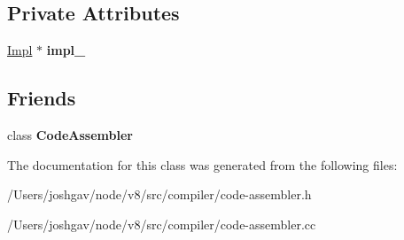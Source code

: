 \subsection*{Private Attributes}
\begin{DoxyCompactItemize}
\item 
\hyperlink{classv8_1_1internal_1_1compiler_1_1_code_assembler_1_1_variable_1_1_impl}{Impl} $\ast$ {\bfseries impl\+\_\+}\hypertarget{classv8_1_1internal_1_1compiler_1_1_code_assembler_1_1_variable_a0fe350255af3de31dba6a4b971629ff7}{}\label{classv8_1_1internal_1_1compiler_1_1_code_assembler_1_1_variable_a0fe350255af3de31dba6a4b971629ff7}

\end{DoxyCompactItemize}
\subsection*{Friends}
\begin{DoxyCompactItemize}
\item 
class {\bfseries Code\+Assembler}\hypertarget{classv8_1_1internal_1_1compiler_1_1_code_assembler_1_1_variable_a3b23f262333c9e8e9f3891ea68a40d19}{}\label{classv8_1_1internal_1_1compiler_1_1_code_assembler_1_1_variable_a3b23f262333c9e8e9f3891ea68a40d19}

\end{DoxyCompactItemize}


The documentation for this class was generated from the following files\+:\begin{DoxyCompactItemize}
\item 
/\+Users/joshgav/node/v8/src/compiler/code-\/assembler.\+h\item 
/\+Users/joshgav/node/v8/src/compiler/code-\/assembler.\+cc\end{DoxyCompactItemize}
